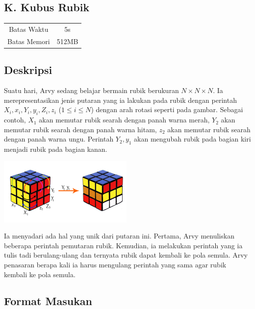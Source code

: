 \documentclass{article}
\begin{document}
\begin{center}
    \section*{K. Kubus Rubik}

    \begin{tabular}{ | c c | }
        \hline
        Batas Waktu  & 5s \\
        Batas Memori & 512MB \\
        \hline
    \end{tabular}
\end{center}

\subsection*{Deskripsi}

Suatu hari, Arvy sedang belajar bermain rubik berukuran $N \times N \times N$.
Ia merepresentasikan jenis putaran yang ia lakukan pada rubik dengan perintah $X_i, x_i, Y_i, y_i, Z_i, z_i$ ($1 \leq i \leq N$) dengan arah rotasi seperti pada gambar.
Sebagai contoh, $X_1$ akan memutar rubik searah dengan panah warna merah, $Y_2$ akan memutar rubik searah dengan panah warna hitam, $z_2$ akan memutar rubik searah dengan panah warna ungu.
Perintah $Y_2, y_1$ akan mengubah rubik pada bagian kiri menjadi rubik pada bagian kanan.

\begin{center}
    \includegraphics[width=250px]{rubic}
\end{center}

Ia menyadari ada hal yang unik dari putaran ini.
Pertama, Arvy menuliskan beberapa perintah pemutaran rubik.
Kemudian, ia melakukan perintah yang ia tulis tadi berulang-ulang dan ternyata rubik dapat kembali ke pola semula.
Arvy penasaran berapa kali ia harus mengulang perintah yang sama agar rubik kembali ke pola semula.

\subsection*{Format Masukan}
\end{document}
